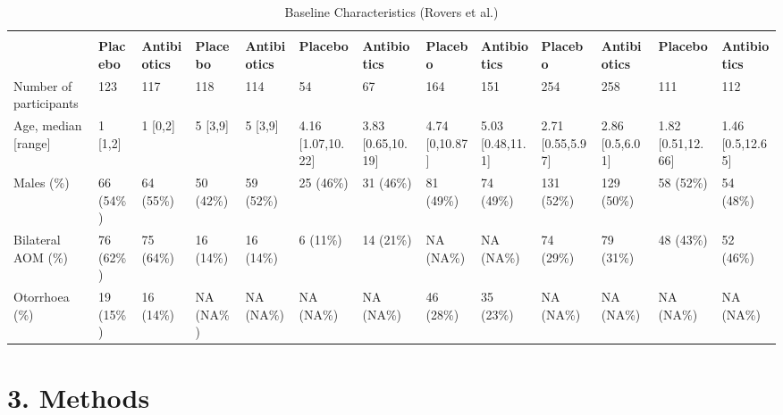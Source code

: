 \documentclass[14pt,]{article}
\begin{document}
\begin{landscape}\begingroup\fontsize{8}{10}\selectfont

\begin{longtabu} to 
\caption{\label{tab:unnamed-chunk-1}Baseline Characteristics (Rovers et al.)}\\
\toprule
{} &  &  &  &  &  &  \\
\cmidrule(l{3pt}r{3pt}){2-3} \cmidrule(l{3pt}r{3pt}){4-5} \cmidrule(l{3pt}r{3pt}){6-7} \cmidrule(l{3pt}r{3pt}){8-9} \cmidrule(l{3pt}r{3pt}){10-11} \cmidrule(l{3pt}r{3pt}){12-13}
\textbf{ } & \textbf{Placebo} & \textbf{Antibiotics} & \textbf{Placebo} & \textbf{Antibiotics} & \textbf{Placebo} & \textbf{Antibiotics} & \textbf{Placebo} & \textbf{Antibiotics} & \textbf{Placebo} & \textbf{Antibiotics} & \textbf{Placebo} & \textbf{Antibiotics}\\
\midrule
{}  Number of participants & 123 & 117 & 118 & 114 & 54 & 67 & 164 & 151 & 254 & 258 & 111 & 112\\
Age, median [range] & 1 [1,2] & 1 [0,2] & 5 [3,9] & 5 [3,9] & 4.16 [1.07,10.22] & 3.83 [0.65,10.19] & 4.74 [0,10.87] & 5.03 [0.48,11.1] & 2.71 [0.55,5.97] & 2.86 [0.5,6.01] & 1.82 [0.51,12.66] & 1.46 [0.5,12.65]\\
  Males (\%) & 66 (54\%) & 64 (55\%) & 50 (42\%) & 59 (52\%) & 25 (46\%) & 31 (46\%) & 81 (49\%) & 74 (49\%) & 131 (52\%) & 129 (50\%) & 58 (52\%) & 54 (48\%)\\
Bilateral AOM (\%) & 76 (62\%) & 75 (64\%) & 16 (14\%) & 16 (14\%) & 6 (11\%) & 14 (21\%) & NA (NA\%) & NA (NA\%) & 74 (29\%) & 79 (31\%) & 48 (43\%) & 52 (46\%)\\
  Otorrhoea (\%) & 19 (15\%) & 16 (14\%) & NA (NA\%) & NA (NA\%) & NA (NA\%) & NA (NA\%) & 46 (28\%) & 35 (23\%) & NA (NA\%) & NA (NA\%) & NA (NA\%) & NA (NA\%)\\
\bottomrule
\end{longtabu}
\endgroup{}
\end{landscape}

\hypertarget{methods}{%
\section{3. Methods}\label{methods}}
\end{document}
